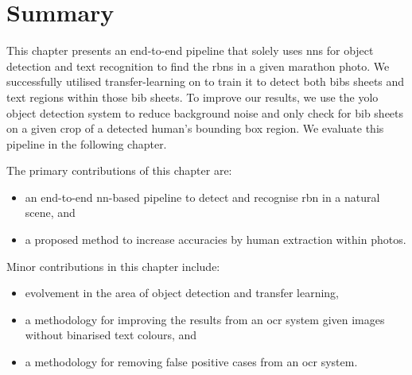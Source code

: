 \section{Summary}

This chapter presents an end-to-end pipeline that solely uses \glspl{nn} for object detection and text recognition to find the \glspl{rbn} in a given marathon photo. We successfully utilised transfer-learning on \frcnn{} to train it to detect both bibs sheets and text regions within those bib sheets. To improve our results, we use the \gls{yolo} object detection system to reduce background noise and only check for bib sheets on a given crop of a detected human's bounding box region. We evaluate this pipeline in the following chapter.

\bigskip

\noindent
The primary contributions of this chapter are:

\begin{itemize}
  \item an end-to-end \gls{nn}-based pipeline to detect and recognise \gls{rbn} in a natural scene, and
  \item a proposed method to increase accuracies by human extraction within photos.
\end{itemize}

\noindent
Minor contributions in this chapter include:

\begin{itemize}
  \item evolvement in the area of object detection and transfer learning,
  \item a methodology for improving the results from an \gls{ocr} system given images without binarised text colours, and
  \item a methodology for removing false positive cases from an \gls{ocr} system.
\end{itemize}